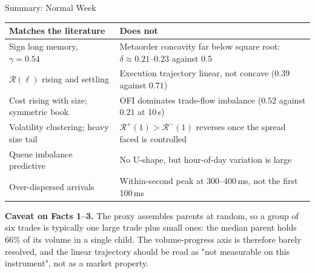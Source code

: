 \documentclass[aspectratio=169,10pt]{beamer}
\begin{document}
\begin{frame}{Summary: Normal Week}
\footnotesize
\begin{tabularx}{\textwidth}{@{}L{0.72}L{1.28}@{}}
\toprule
\textbf{Matches the literature} & \textbf{Does not} \\
\midrule
Sign long memory, $\gamma=0.54$ &
Metaorder concavity far below square root: $\delta\approx0.21$--$0.23$ against 0.5 \\
$\mathcal{R}(\ell)$ rising and settling &
Execution trajectory linear, not concave ($0.39$ against $0.71$) \\
Cost rising with size; symmetric book &
OFI dominates trade-flow imbalance ($0.52$ against $0.21$ at 10\,s) \\
Volatility clustering; heavy size tail &
$\mathcal{R}^{+}(1)>\mathcal{R}^{-}(1)$ reverses once the spread faced is controlled \\
Queue imbalance predictive &
No U-shape, but hour-of-day variation is large \\
Over-dispersed arrivals &
Within-second peak at 300--400\,ms, not the first 100\,ms \\
\bottomrule
\end{tabularx}

\medskip
\textbf{Caveat on Facts 1--3.} The proxy assembles parents at random, so a group of six trades is
typically one large trade plus small ones: the median parent holds 66\% of its volume in a single
child. The volume-progress axis is therefore barely resolved, and the linear trajectory should be
read as "not measurable on this instrument", not as a market property.
\end{frame}
\end{document}
